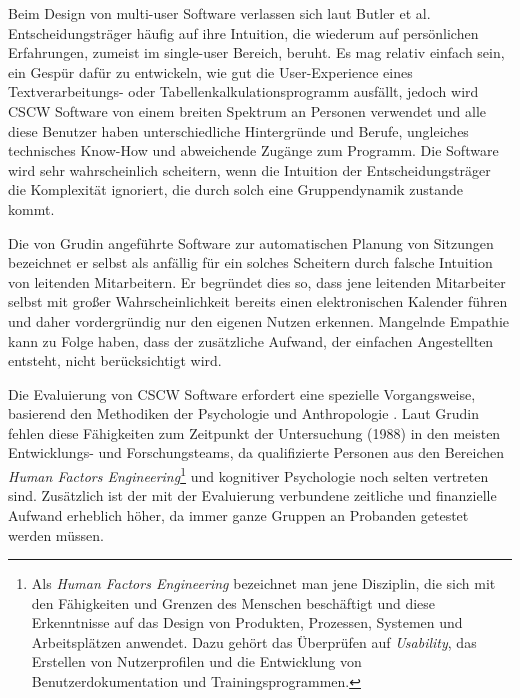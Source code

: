 \medskip Beim Design von multi-user Software verlassen sich laut Butler et al. \citep{ButlerK:1987} Entscheidungsträger häufig auf ihre Intuition, die wiederum auf persönlichen Erfahrungen, zumeist im single-user Bereich, beruht. Es mag relativ einfach sein, ein Gespür dafür zu entwickeln, wie gut die User-Experience eines Textverarbeitungs- oder Tabellenkalkulationsprogramm ausfällt, jedoch wird CSCW Software von einem breiten Spektrum an Personen verwendet und alle diese Benutzer haben unterschiedliche Hintergründe und Berufe, ungleiches technisches Know-How und abweichende Zugänge zum Programm. Die Software wird sehr wahrscheinlich scheitern, wenn die Intuition der Entscheidungsträger die Komplexität ignoriert, die durch solch eine Gruppendynamik zustande kommt. 

Die von Grudin \citep{Grudin:1988p126} angeführte Software zur automatischen Planung von Sitzungen bezeichnet er selbst als anfällig für ein solches Scheitern durch falsche Intuition von leitenden Mitarbeitern. Er begründet dies so, dass jene leitenden Mitarbeiter selbst mit großer Wahrscheinlichkeit bereits einen elektronischen Kalender führen und daher vordergründig nur den eigenen Nutzen erkennen. Mangelnde Empathie kann zu Folge haben, dass der zusätzliche Aufwand, der einfachen Angestellten entsteht, nicht berücksichtigt wird. 

\medskip Die Evaluierung von CSCW Software erfordert eine spezielle Vorgangsweise, basierend den Methodiken der Psychologie und Anthropologie \citep{Grudin:1988p126}. Laut Grudin fehlen diese Fähigkeiten zum Zeitpunkt der Untersuchung (1988) in den meisten Entwicklungs- und Forschungsteams, da qualifizierte Personen aus den Bereichen \emph{Human Factors Engineering}\footnote{Als \emph{Human Factors Engineering} bezeichnet man jene Disziplin, die sich mit den Fähigkeiten und Grenzen des Menschen beschäftigt und diese Erkenntnisse auf das Design von Produkten, Prozessen, Systemen und Arbeitsplätzen anwendet. Dazu gehört das Überprüfen auf \emph{Usability}, das Erstellen von Nutzerprofilen und die Entwicklung von Benutzerdokumentation und Trainingsprogrammen.} und kognitiver Psychologie noch selten vertreten sind. Zusätzlich ist der mit der Evaluierung verbundene zeitliche und finanzielle Aufwand erheblich höher, da immer ganze Gruppen an Probanden getestet werden müssen.

